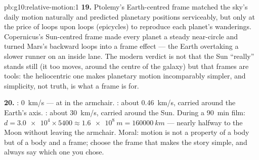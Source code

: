 \begin{solution}{pb:g10:relative-motion:1}
\textbf{19.} Ptolemy's Earth-centred frame matched the sky's daily
motion naturally and predicted planetary positions serviceably, but
only at the price of loops upon loops (epicycles) to reproduce each
planet's wanderings. Copernicus's Sun-centred frame made every planet a
steady near-circle and turned Mars's backward loops into a frame
effect --- the Earth overtaking a slower runner on an inside lane. The
modern verdict is not that the Sun ``really'' stands still (it too
moves, around the centre of the galaxy) but that frames are tools: the
heliocentric one makes planetary motion incomparably simpler, and
simplicity, not truth, is what a frame is for.

\textbf{20.} : \qty{0}{km/s} --- at  in the armchair.
: about \qty{0.46}{km/s}, carried around the Earth's
axis. : about \qty{30}{km/s}, carried around the Sun.
During a \qty{90}{min} film: $d = \num{3.0e4} \times 5400
\approx \qty{1.6e8}{m} = \qty{160000}{km}$ --- nearly halfway to the
Moon without leaving the armchair. Moral: motion is not a property of a
body but of a body and a frame; choose the frame that makes the story
simple, and always say which one you chose.
\end{solution}
